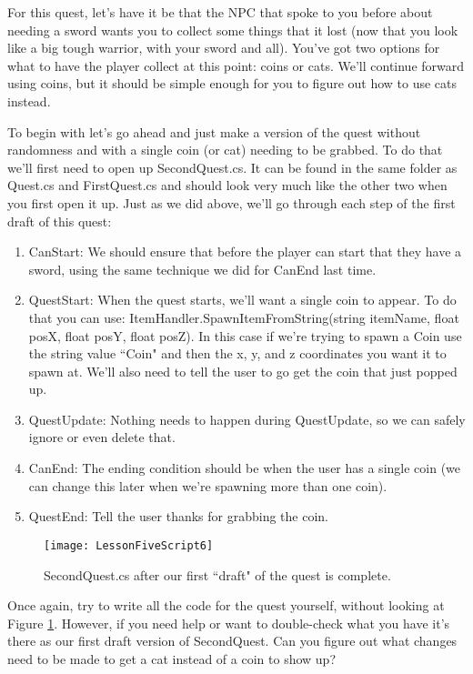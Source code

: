 \documentclass{article}
\begin{document}
For this quest, let's have it be that the NPC that spoke to you before about needing a sword wants you to collect some things that it lost (now that you look like a big tough warrior, with your sword and all). You've got two options for what to have the player collect at this point: coins or cats. We'll continue forward using coins, but it should be simple enough for you to figure out how to use cats instead. 

To begin with let's go ahead and just make a version of the quest without randomness and with a single coin (or cat) needing to be grabbed. To do that we'll first need to open up SecondQuest.cs. It can be found in the same folder as Quest.cs and FirstQuest.cs and should look very much like the other two when you first open it up. Just as we did above, we'll go through each step of the first draft of this quest: 

\begin{enumerate}
 \item CanStart: We should ensure that before the player can start that they have a sword, using the same technique we did for CanEnd last time.
 \item QuestStart: When the quest starts, we'll want a single coin to appear. To do that you can use: ItemHandler.SpawnItemFromString(string itemName, float posX, float posY, float posZ). In this case if we're trying to spawn a Coin use the string value ``Coin" and then the x, y, and z coordinates you want it to spawn at. We'll also need to tell the user to go get the coin that just popped up.
 \item QuestUpdate: Nothing needs to happen during QuestUpdate, so we can safely ignore or even delete that.
 \item CanEnd: The ending condition should be when the user has a single coin (we can change this later when we're spawning more than one coin).
 \item QuestEnd: Tell the user thanks for grabbing the coin.
\end{enumerate}

\begin{figure}
  \texttt{[image: LessonFiveScript6]}
  \caption{SecondQuest.cs after our first ``draft" of the quest is complete.}
  \label{fig:LessonFiveScript6}
\end{figure}

Once again, try to write all the code for the quest yourself, without looking at Figure \ref{fig:LessonFiveScript6}. However, if you need help or want to double-check what you have it's there as our first draft version of SecondQuest. Can you figure out what changes need to be made to get a cat instead of a coin to show up?
\end{document}
